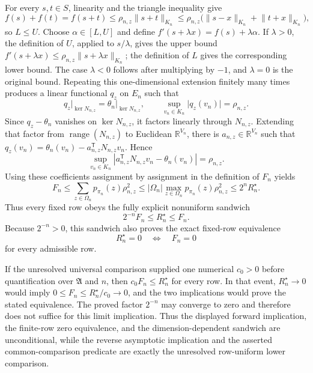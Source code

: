 For every \(s,t\in S\), linearity and the triangle inequality give
\[
 f(s)+f(t)=f(s+t)
 \le\rho_{n,z}\lVert s+t\rVert_{K_n}
 \le\rho_{n,z}\bigl(\lVert s-x\rVert_{K_n}+\lVert t+x\rVert_{K_n}\bigr),
\]
so \(L\le U\). Choose \(\alpha\in[L,U]\) and define \(f'(s+\lambda x)=f(s)+\lambda\alpha\). If \(\lambda>0\), the definition of \(U\), applied to \(s/\lambda\), gives the upper bound \(f'(s+\lambda x)\le\rho_{n,z}\lVert s+\lambda x\rVert_{K_n}\); the definition of \(L\) gives the corresponding lower bound. The case \(\lambda<0\) follows after multiplying by \(-1\), and \(\lambda=0\) is the original bound. Repeating this one-dimensional extension finitely many times produces a linear functional \(q_z\) on \(E_n\) such that
\[
 q_z\big|_{\ker N_{n,z}}=\theta_n\big|_{\ker N_{n,z}},\qquad
 \sup_{v_n\in K_n}\lvert q_z(v_n)\rvert=\rho_{n,z}.
\]
Since \(q_z-\theta_n\) vanishes on \(\ker N_{n,z}\), it factors linearly through \(N_{n,z}\). Extending that factor from \(\operatorname{range}(N_{n,z})\) to Euclidean \(\mathbb R^{V_n}\), there is \(a_{n,z}\in\mathbb R^{V_n}\) such that \(q_z(v_n)=\theta_n(v_n)-a_{n,z}^{\mathsf T}N_{n,z}v_n\). Hence
\[
 \sup_{v_n\in K_n}\left\lvert a_{n,z}^{\mathsf T}N_{n,z}v_n-\theta_n(v_n)\right\rvert
 =\rho_{n,z}.
\]
Using these coefficients assignment by assignment in the definition of \(F_n\) yields
\[
 F_n\le\sum_{z\in\Omega_n}p_{\pi_n}(z)\rho_{n,z}^2
 \le\lvert\Omega_n\rvert\max_{z\in\Omega_n}p_{\pi_n}(z)\rho_{n,z}^2
 \le2^nR_n^{\star}.
\]
Thus every fixed row obeys the fully explicit nonuniform sandwich
\[
 2^{-n}F_n\le R_n^{\star}\le F_n.
\]
Because \(2^{-n}>0\), this sandwich also proves the exact fixed-row equivalence
\[
 R_n^{\star}=0\quad\Longleftrightarrow\quad F_n=0
\]
for every admissible row.

If the unresolved universal comparison supplied one numerical \(c_0>0\) before quantification over \(\mathfrak A\) and \(n\), then \(c_0F_n\le R_n^{\star}\) for every row. In that event, \(R_n^{\star}\to0\) would imply \(0\le F_n\le R_n^{\star}/c_0\to0\), and the two implications would prove the stated equivalence. The proved factor \(2^{-n}\) may converge to zero and therefore does not suffice for this limit implication. Thus the displayed forward implication, the finite-row zero equivalence, and the dimension-dependent sandwich are unconditional, while the reverse asymptotic implication and the asserted common-comparison predicate are exactly the unresolved row-uniform lower comparison.
